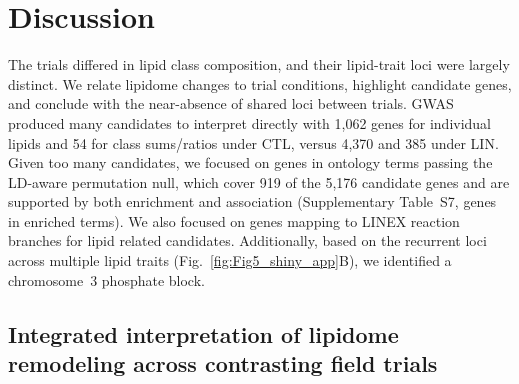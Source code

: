 \documentclass[9pt,twocolumn,twoside]{rilabRxiv}
\begin{document}
\section{Discussion}

The trials differed in lipid class composition, and their lipid-trait loci were largely distinct. We relate lipidome changes to trial conditions, highlight candidate genes, and conclude with the near-absence of shared loci between trials. GWAS produced many candidates to interpret directly with 1,062 genes for individual lipids and 54 for class sums/ratios under CTL, versus 4,370 and 385 under LIN. Given too many candidates, we focused on genes in ontology terms passing the LD-aware permutation null, which cover 919 of the 5,176 candidate genes and are supported by both enrichment and association (Supplementary Table~S7, genes in enriched terms). We also focused on genes mapping to LINEX reaction branches for lipid related candidates. Additionally, based on the recurrent loci across multiple lipid traits (Fig.~\ref{fig:Fig5_shiny_app}B), we identified a chromosome~3 phosphate block.


\subsection*{Integrated interpretation of lipidome remodeling across contrasting field trials}
\end{document}
